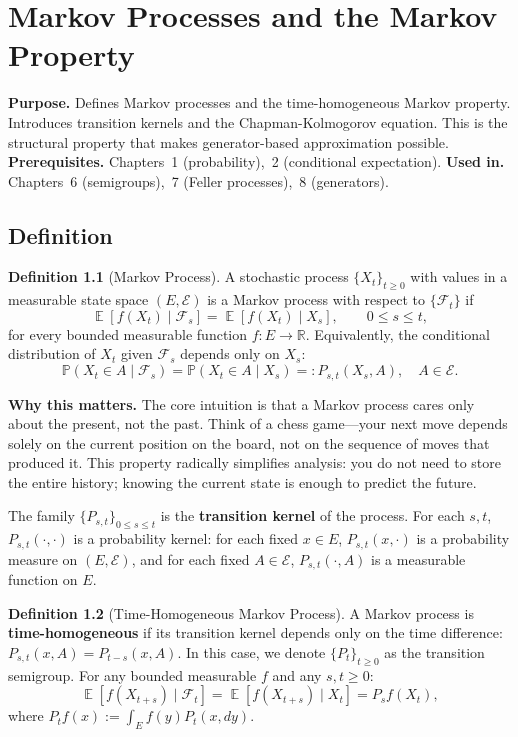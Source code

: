 \documentclass[11pt,a4paper,openany]{book}
\theoremstyle{definition}
\newtheorem{definition}{Definition}[chapter]
\theoremstyle{plain}
\theoremstyle{remark}
\DeclareMathOperator{\E}{\mathbb{E}}
\newcommand{\1}{\mathbbm{1}}
\newcommand{\R}{\mathbb{R}}
\newcommand{\F}{\mathcal{F}}
\newcommand{\Pbb}{\mathbb{P}}
\newcommand{\calE}{\mathcal{E}}
\begin{document}
\chapter{Markov Processes and the Markov Property}

\noindent\textbf{Purpose.} Defines Markov processes and the time-homogeneous Markov property. Introduces transition kernels and the Chapman-Kolmogorov equation. This is the structural property that makes generator-based approximation possible.
\textbf{Prerequisites.} Chapters~1 (probability),~2 (conditional expectation).
\textbf{Used in.} Chapters~6 (semigroups),~7 (Feller processes),~8 (generators).

\section{Definition}

\begin{definition}[Markov Process]
A stochastic process $\{X_{t}\}_{t \geq 0}$ with values in a measurable state space $(E, \calE)$ is a Markov process with respect to $\{\F_{t}\}$ if
\[
\E[f(X_{t}) \mid \F_{s}] = \E[f(X_{t}) \mid X_{s}], \qquad 0 \leq s \leq t,
\]
for every bounded measurable function $f: E \to \R$. Equivalently, the conditional distribution of $X_{t}$ given $\F_{s}$ depends only on $X_{s}$:
\[
\Pbb(X_{t} \in A \mid \F_{s}) = \Pbb(X_{t} \in A \mid X_{s}) =: P_{s,t}(X_{s}, A), \quad A \in \calE.
\]
\end{definition}

\medskip
\noindent\textbf{Why this matters.} The core intuition is that a Markov process cares only about the present, not the past. Think of a chess game---your next move depends solely on the current position on the board, not on the sequence of moves that produced it. This property radically simplifies analysis: you do not need to store the entire history; knowing the current state is enough to predict the future.

The family $\{P_{s,t}\}_{0 \leq s \leq t}$ is the \textbf{transition kernel} of the process. For each $s, t$, $P_{s,t}(\cdot, \cdot)$ is a probability kernel: for each fixed $x \in E$, $P_{s,t}(x, \cdot)$ is a probability measure on $(E, \calE)$, and for each fixed $A \in \calE$, $P_{s,t}(\cdot, A)$ is a measurable function on $E$.

\begin{definition}[Time-Homogeneous Markov Process]
A Markov process is \textbf{time-homogeneous} if its transition kernel depends only on the time difference: $P_{s,t}(x, A) = P_{t-s}(x, A)$. In this case, we denote $\{P_{t}\}_{t \geq 0}$ as the transition semigroup. For any bounded measurable $f$ and any $s,t \geq 0$:
\[
\E[f(X_{t+s}) \mid \F_{t}] = \E[f(X_{t+s}) \mid X_{t}] = P_{s}f(X_{t}),
\]
where $P_{t}f(x) := \int_{E} f(y) P_{t}(x, dy)$.
\end{definition}
\end{document}

